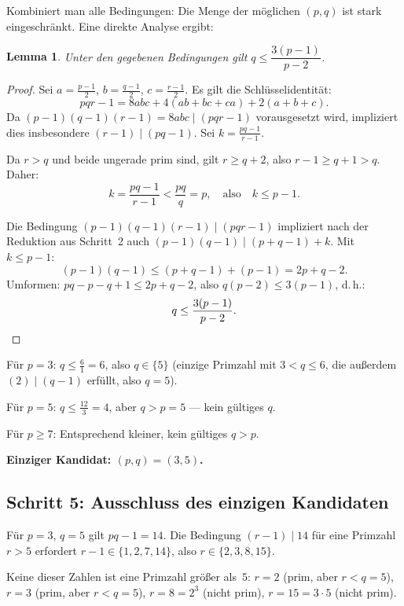 \documentclass[12pt,a4paper]{amsart}
\newtheorem{lemma}[theorem]{Lemma}
\theoremstyle{definition}
\begin{document}
\medskip
Kombiniert man alle Bedingungen: Die Menge der möglichen $(p, q)$ ist stark
eingeschränkt. Eine direkte Analyse ergibt:

\begin{lemma}
\label{lem:grenze_q}
Unter den gegebenen Bedingungen gilt $q \le \dfrac{3(p-1)}{p-2}$.
\end{lemma}

\begin{proof}
Sei $a = \tfrac{p-1}{2}$, $b = \tfrac{q-1}{2}$, $c = \tfrac{r-1}{2}$.
Es gilt die Schlüsselidentität:
\[
  pqr - 1 = 8abc + 4(ab + bc + ca) + 2(a + b + c).
\]
Da $(p-1)(q-1)(r-1) = 8abc \mid (pqr - 1)$ vorausgesetzt wird, impliziert dies insbesondere
$(r-1) \mid (pq - 1)$. Sei $k = \tfrac{pq-1}{r-1}$.

Da $r > q$ und beide ungerade prim sind, gilt $r \ge q + 2$, also $r - 1 \ge q + 1 > q$.
Daher:
\[
  k = \frac{pq - 1}{r - 1} < \frac{pq}{q} = p, \quad\text{also}\quad k \le p - 1.
\]

Die Bedingung $(p-1)(q-1)(r-1) \mid (pqr-1)$ impliziert nach der Reduktion aus Schritt~2
auch $(p-1)(q-1) \mid (p + q - 1) + k$. Mit $k \le p - 1$:
\[
  (p-1)(q-1) \le (p + q - 1) + (p - 1) = 2p + q - 2.
\]
Umformen: $pq - p - q + 1 \le 2p + q - 2$, also $q(p-2) \le 3(p-1)$, d.\,h.:
\[
  q \le \frac{3(p-1)}{p-2}. \qedhere
\]
\end{proof}

Für $p = 3$: $q \le \tfrac{6}{1} = 6$, also $q \in \{5\}$ (einzige Primzahl mit $3 < q \le 6$, die außerdem $(2) \mid (q-1)$ erfüllt, also $q = 5$).

Für $p = 5$: $q \le \tfrac{12}{3} = 4$, aber $q > p = 5$ — kein gültiges $q$.

Für $p \ge 7$: Entsprechend kleiner, kein gültiges $q > p$.

\medskip
\noindent\textbf{Einziger Kandidat: $(p, q) = (3, 5)$.}

\subsection{Schritt 5: Ausschluss des einzigen Kandidaten}

Für $p = 3$, $q = 5$ gilt $pq - 1 = 14$. Die Bedingung $(r-1) \mid 14$ für eine Primzahl
$r > 5$ erfordert $r - 1 \in \{1, 2, 7, 14\}$, also $r \in \{2, 3, 8, 15\}$.

Keine dieser Zahlen ist eine Primzahl größer als~$5$:
$r = 2$ (prim, aber $r < q = 5$), $r = 3$ (prim, aber $r < q = 5$),
$r = 8 = 2^3$ (nicht prim), $r = 15 = 3 \cdot 5$ (nicht prim).
\end{document}
